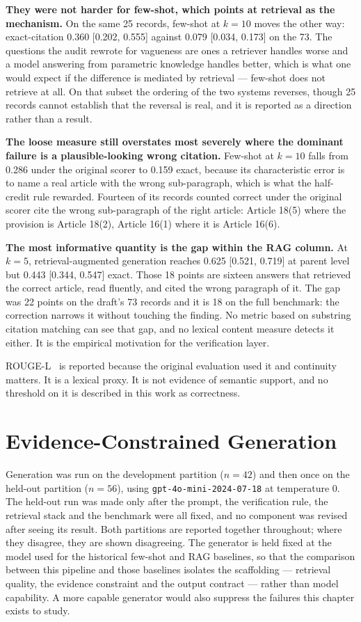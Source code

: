 \textbf{They were not harder for few-shot, which points at retrieval as the
mechanism.} On the same 25 records, few-shot at $k=10$ moves the other way:
exact-citation 0.360 [0.202, 0.555] against 0.079 [0.034, 0.173] on the 73. The
questions the audit rewrote for vagueness are ones a retriever handles worse and
a model answering from parametric knowledge handles better, which is what one
would expect if the difference is mediated by retrieval --- few-shot does not
retrieve at all. On that subset the ordering of the two systems reverses, though
25 records cannot establish that the reversal is real, and it is reported as a
direction rather than a result.

\textbf{The loose measure still overstates most severely where the dominant
failure is a plausible-looking wrong citation.} Few-shot at $k=10$ falls from
0.286 under the original scorer to 0.159 exact, because its characteristic error
is to name a real article with the wrong sub-paragraph, which is what the
half-credit rule rewarded. Fourteen of its records counted correct under the
original scorer cite the wrong sub-paragraph of the right article: Article 18(5)
where the provision is Article 18(2), Article 16(1) where it is Article 16(6).

\textbf{The most informative quantity is the gap within the RAG column.} At
$k=5$, retrieval-augmented generation reaches 0.625 [0.521, 0.719] at parent level
but 0.443 [0.344, 0.547] exact. Those 18 points are sixteen answers that retrieved
the correct article, read fluently, and cited the wrong paragraph of it. The gap
was 22 points on the draft's 73 records and it is 18 on the full benchmark: the
correction narrows it without touching the finding. No metric based on substring
citation matching can see that gap, and no lexical content measure detects it
either. It is the empirical motivation for the verification layer.

ROUGE-L~\cite{lin2004rouge} is reported because the original evaluation used it
and continuity matters. It is a lexical proxy. It is not evidence of semantic
support, and no threshold on it is described in this work as correctness.

\section{Evidence-Constrained Generation}
\label{sec:generation}

Generation was run on the development partition ($n = 42$) and then once on the
held-out partition ($n = 56$), using \texttt{gpt-4o-mini-2024-07-18} at
temperature 0. The held-out run was made only after the prompt, the verification
rule, the retrieval stack and the benchmark were all fixed, and no component was
revised after seeing its result. Both partitions are reported together
throughout; where they disagree, they are shown disagreeing. The generator is held
fixed at the model used for the historical few-shot and RAG baselines, so that
the comparison between this pipeline and those baselines isolates the scaffolding
--- retrieval quality, the evidence constraint and the output contract --- rather
than model capability. A more capable generator would also suppress the failures
this chapter exists to study.

